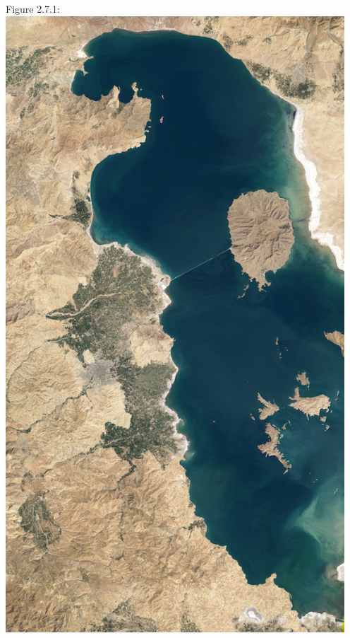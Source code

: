\documentclass[12pt]{article}
\begin{document}
\begin{center}
  Figure 2.7.1:\\
  \includegraphics[width=5in]{plots/km_plot8.jpg}\\


\end{center}
\end{document}
